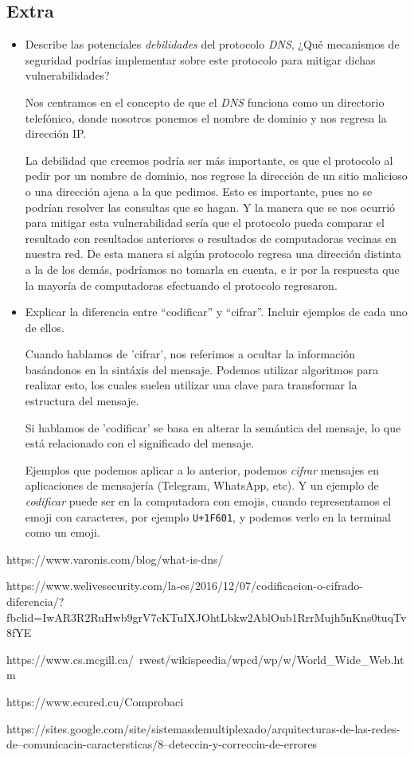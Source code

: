 \documentclass[spanish,12pt,letterpaper]{article}
\begin{document}
\subsection{Extra}
\begin{itemize}
\item Describe las potenciales \textit{debilidades} del protocolo \textit{DNS},
  ¿Qué mecanismos de seguridad podrías implementar sobre este protocolo para
  mitigar dichas vulnerabilidades?

  Nos centramos en el concepto de que el \textit{DNS} funciona como un directorio
  telefónico, donde nosotros ponemos el nombre de dominio y nos regresa la
  dirección IP.

  La debilidad que creemos podría ser más importante, es que el protocolo al
  pedir por un nombre de dominio, nos regrese la dirección de un sitio malicioso
  o una dirección ajena a la que pedimos. Esto es importante, pues no se podrían
  resolver las consultas que se hagan. Y la manera que se nos ocurrió para
  mitigar esta vulnerabilidad sería que el protocolo pueda comparar el resultado
  con resultados anteriores o resultados de computadoras vecinas en nuestra red.
  De esta manera si algún protocolo regresa una dirección distinta a la de los
  demás, podríamos no tomarla en cuenta, e ir por la respuesta que la mayoría de
  computadoras efectuando el protocolo regresaron.

  
\item Explicar la diferencia entre ``codificar'' y ``cifrar''. Incluir ejemplos
  de cada uno de ellos.

  Cuando hablamos de 'cifrar', nos referimos a ocultar la información basándonos
  en la sintáxis del mensaje. Podemos utilizar algoritmos para realizar esto, los
  cuales suelen utilizar una clave para transformar la estructura del mensaje.

  Si hablamos de 'codificar' se basa en alterar la semántica del mensaje, lo que
  está relacionado con el significado del mensaje.

  Ejemplos que podemos aplicar a lo anterior, podemos \textit{cifrar} mensajes en
  aplicaciones de mensajería (Telegram, WhatsApp, etc). Y un ejemplo de \textit{
    codificar} puede ser en la computadora con emojis, cuando representamos el
  emoji con caracteres, por ejemplo \texttt{U+1F601}, y podemos verlo en la
  terminal como un emoji.
\end{itemize}

\begin{thebibliography}{9}
  https://www.varonis.com/blog/what-is-dns/

  https://www.welivesecurity.com/la-es/2016/12/07/codificacion-o-cifrado-diferencia/?fbclid=IwAR3R2RuHwb9grV7cKTuIXJOhtLbkw2AblOub1RrrMujh5nKns0tuqTv8fYE

  https://www.cs.mcgill.ca/~rwest/wikispeedia/wpcd/wp/w/World\_Wide\_Web.htm

  https://www.ecured.cu/Comprobaci%

  https://sites.google.com/site/sistemasdemultiplexado/arquitecturas-de-las-redes-de--comunicacin-caractersticas/8--deteccin-y-correccin-de-errores


\end{thebibliography}
\end{document}
